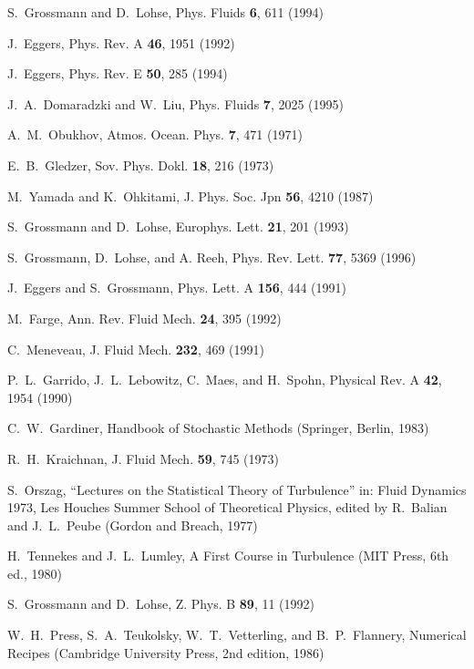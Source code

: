 \documentclass[dc]{svjour}
\begin{document}
\begin{thebibliography}{47}
 S.~Grossmann and D.~Lohse,  Phys. Fluids
    {\bf 6}, 611 (1994)

 J.~Eggers,  Phys. Rev. A {\bf 46}, 1951 (1992)

 J.~Eggers,  Phys. Rev. E {\bf 50}, 285 (1994)

 J.~A.~Domaradzki and W.~Liu,  Phys. Fluids {\bf 7}, 2025 (1995)

 A.~M.~Obukhov,  Atmos. Ocean. Phys.
 {\bf 7}, 471 (1971)

 E.~B.~Gledzer,  Sov. Phys. Dokl.
 {\bf 18}, 216 (1973)

 M.~Yamada and K.~Ohkitami, J. Phys. Soc. Jpn
  {\bf 56}, 4210 (1987)

 S.~Grossmann and D.~Lohse,  Europhys. Lett. {\bf 21}, 201 (1993)

 S.~Grossmann, D.~Lohse, and A. Reeh,
Phys. Rev. Lett. {\bf 77}, 5369 (1996)

 J.~Eggers and S.~Grossmann,  Phys. Lett. A
{\bf 156}, 444 (1991)

 M.~Farge,  Ann. Rev. Fluid Mech. {\bf 24},
               395 (1992)

 C.~Meneveau, J. Fluid Mech. {\bf 232},
              469 (1991)

 P.~L.~Garrido, J.~L.~Lebowitz, C.~Maes, and
H.~Spohn, Physical Rev. A {\bf 42}, 1954 (1990)

 C.~W.~Gardiner, {Handbook of Stochastic Methods}
(Springer, Berlin, 1983)

 R.~H.~Kraichnan,  J. Fluid Mech. {\bf 59}, 745 (1973)

 S.~Orszag, ``Lectures on the Statistical
     Theory of Turbulence'' in: {Fluid Dynamics 1973, Les
    Houches Summer School of Theoretical Physics}, edited by R.~Balian and
    J.~L.~Peube (Gordon and Breach, 1977)

 H.~Tennekes and J.~L.~Lumley, {A First Course in
    Turbulence} (MIT Press, 6th ed., 1980)

 S.~Grossmann and D.~Lohse,  Z. Phys. B {\bf 89}, 11 (1992)

 W.~H.~Press, S.~A.~Teukolsky, W.~T.~Vetterling,
  and B.~P.~Flannery, {Numerical Recipes} (Cambridge University
       Press, 2nd edition, 1986)


\end{thebibliography}
\end{document}
